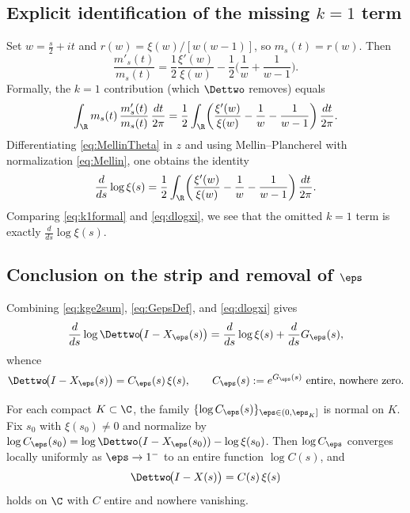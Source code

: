 \subsection{Explicit identification of the missing \texorpdfstring{$k=1$}{k=1} term}
Set \(w=\tfrac{s}{2}+it\) and \(r(w)=\xi(w)/[w(w-1)]\), so \(m_s(t)=r(w)\). Then
\[
\frac{m'_s(t)}{m_s(t)}=\frac12\frac{\xi'(w)}{\xi(w)} - \frac12\Big(\frac{1}{w}+\frac{1}{w-1}\Big).
\]
Formally, the \(k=1\) contribution (which \(\Dettwo\) removes) equals
\begin{equation}\label{eq:k1formal}
\int_{\R} m_s(t)\,\frac{m'_s(t)}{m_s(t)}\,\frac{dt}{2\pi}
=\frac12\int_{\R}\!\left(\frac{\xi'(w)}{\xi(w)}-\frac{1}{w}-\frac{1}{w-1}\right)\frac{dt}{2\pi}.
\end{equation}
Differentiating \eqref{eq:MellinTheta} in \(z\) and using Mellin--Plancherel with normalization \eqref{eq:Mellin}, one obtains the identity
\begin{equation}\label{eq:dlogxi}
\frac{d}{ds}\log \xi(s)
=\frac12\int_{\R}\!\left(\frac{\xi'(w)}{\xi(w)}-\frac{1}{w}-\frac{1}{w-1}\right)\frac{dt}{2\pi}.
\end{equation}
Comparing \eqref{eq:k1formal} and \eqref{eq:dlogxi}, we see that the omitted \(k=1\) term is exactly \(\frac{d}{ds}\log\xi(s)\).

\subsection{Conclusion on the strip and removal of \texorpdfstring{$\eps$}{epsilon}}
Combining \eqref{eq:kge2sum}, \eqref{eq:GepsDef}, and \eqref{eq:dlogxi} gives
\[
\frac{d}{ds}\log \Dettwo\!\big(I-X_\eps(s)\big)=\frac{d}{ds}\log \xi(s)+\frac{d}{ds} G_\eps(s),
\]
whence
\begin{equation}\label{eq:epsIdentity}
\Dettwo\!\big(I-X_\eps(s)\big)= C_\eps(s)\,\xi(s),\qquad C_\eps(s):=e^{G_\eps(s)}\ \text{entire, nowhere zero}.
\end{equation}

\begin{lemma}\label{lem:NormalFamilies}
For each compact \(K\subset\C\), the family \(\{\log C_\eps(s)\}_{\eps\in(0,\eps_K]}\) is normal on \(K\). Fix \(s_0\) with \(\xi(s_0)\neq 0\) and normalize by \(\log C_\eps(s_0)=\log \Dettwo(I-X_\eps(s_0))-\log \xi(s_0)\). Then \(\log C_\eps\) converges locally uniformly as \(\eps\to1^-\) to an entire function \(\log C(s)\), and
\begin{equation}\label{eq:MainAfterEps}
\Dettwo\!\big(I-X(s)\big)=C(s)\,\xi(s)
\end{equation}
holds on \(\C\) with \(C\) entire and nowhere vanishing.
\end{lemma}

